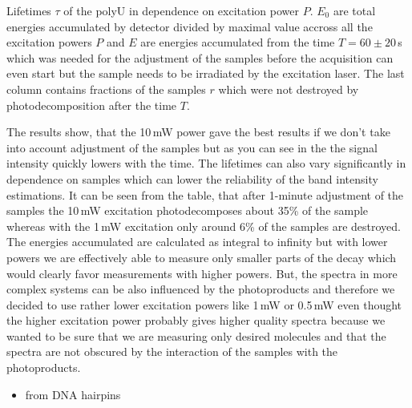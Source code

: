 \begin{table}
	\centering
	
	\caption{Lifetimes $\tau$ of the polyU in dependence on excitation power
		$P$. $E_0$ are total energies accumulated by detector divided by maximal
		value accross all the excitation powers $P$ and $E$ are energies
		accumulated from the time $T = 60\pm20$\,s which was needed for the
		adjustment of the samples before the acquisition can even start but
		the sample needs to be irradiated by the excitation laser. The last column
		contains fractions of the samples $r$ which were not destroyed by
		photodecomposition after the time $T$.
	}
	\label{\tablabel{power_optim:lifetimes_triplexes}}
\end{table}

The results show, that the 10\,mW power gave the best results if we don't take
into account adjustment of the samples but as you can see in the
the signal intensity quickly lowers with the time. The lifetimes can also
vary significantly in dependence on samples which can lower the reliability of
the band intensity estimations. It can be seen from the table, that after
1-minute adjustment of the samples the 10\,mW excitation photodecomposes
about 35\% of the sample whereas with the 1\,mW excitation only around 6\% of
the samples are destroyed. The energies accumulated are calculated as integral
to infinity but with lower powers we are effectively able to measure only
smaller parts of the decay which would clearly favor measurements with higher
powers. But, the spectra in more complex systems can be also influenced by the
photoproducts and therefore we decided to use rather lower excitation powers
like 1\,mW or 0.5\,mW even thought the higher excitation power probably gives
higher quality spectra because we wanted to be sure that we are measuring only
desired molecules and that the spectra are not obscured by the interaction of
the samples with the photoproducts.

\begin{itemize}
	\item from DNA hairpins
\end{itemize}
